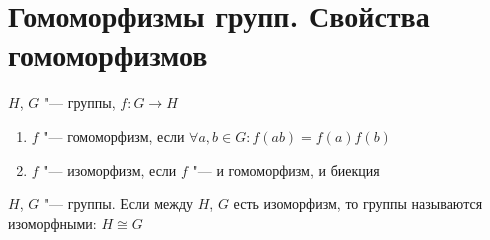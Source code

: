 \section{Гомоморфизмы групп. Свойства гомоморфизмов}
\begin{Def}
	$H$, $G$ "--- группы, $f: G \to H$
	\begin{enumerate}
		\item $f$ "--- гомоморфизм, если $\forall a, b \in G \colon f(ab) = f(a)f(b)$
		\item $f$ "--- изоморфизм, если $f$ "--- и гомоморфизм, и биекция
	\end{enumerate}
\end{Def}

\begin{Def}
	$H$, $G$ "--- группы. Если между $H$, $G$ есть изоморфизм, то группы называются изоморфными: $H \cong G$
\end{Def}						

